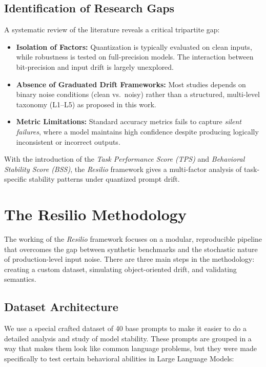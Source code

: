 \documentclass[conference]{IEEEtran}
\begin{document}
\subsection{Identification of Research Gaps}

A systematic review of the literature reveals a critical tripartite gap:

\begin{itemize}
\item \textbf{Isolation of Factors:} Quantization is typically evaluated on clean inputs, while robustness is tested on full-precision models. The interaction between bit-precision and input drift is largely unexplored.

\item \textbf{Absence of Graduated Drift Frameworks:} Most studies depends on binary noise conditions (clean vs.\ noisy) rather than a structured, multi-level taxonomy (L1--L5) as proposed in this work.

\item \textbf{Metric Limitations:} Standard accuracy metrics fails to capture \textit{silent failures}, where a model maintains high confidence despite producing logically inconsistent or incorrect outputs.
\end{itemize}

With the introduction of the \textit{Task Performance Score (TPS)} and \textit{Behavioral Stability Score (BSS)}, the \textit{Resilio} framework gives a multi-factor analysis of task-specific stability patterns under quantized prompt drift.






\section{The Resilio Methodology}

The working of the \textit{Resilio} framework focuses on a modular, reproducible pipeline that overcomes the gap between synthetic benchmarks and the stochastic nature of production-level input noise. There are three main steps in the methodology: creating a custom dataset, simulating object-oriented drift, and validating semantics.

\subsection{Dataset Architecture}

We use a special crafted dataset of 40 base prompts to make it easier to do a detailed analysis and study of model stability. These prompts are grouped in a way that makes them look like common language problems, but they were made specifically to test certain behavioral abilities in Large Language Models:
\end{document}
